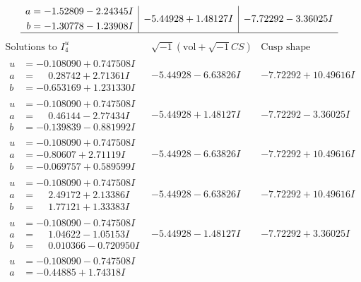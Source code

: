 \documentclass[1p]{elsarticle_modified}
\theoremstyle{definition}
\newcommand{\I}{\sqrt{-1}}
\begin{document}
$$\begin{array}{c|c|c}
\begin{aligned}
a &= -1.52809 - 2.24345 I \\
b &= -1.30778 - 1.23908 I\end{aligned}
 & -5.44928 + 1.48127 I & -7.72292 - 3.36025 I\\
 \hline 
 \end{array}$$\newpage$$\begin{array}{c|c|c}  
\text{Solutions to }I^u_{4}& \I (\text{vol} + \sqrt{-1}CS) & \text{Cusp shape}\\
 \hline 
\begin{aligned}
u &= -0.108090 + 0.747508 I \\
a &= \phantom{-}0.28742 + 2.71361 I \\
b &= -0.653169 + 1.231330 I\end{aligned}
 & -5.44928 - 6.63826 I & -7.72292 + 10.49616 I \\ \hline\begin{aligned}
u &= -0.108090 + 0.747508 I \\
a &= \phantom{-}0.46144 - 2.77434 I \\
b &= -0.139839 - 0.881992 I\end{aligned}
 & -5.44928 + 1.48127 I & -7.72292 - 3.36025 I \\ \hline\begin{aligned}
u &= -0.108090 + 0.747508 I \\
a &= -0.80607 + 2.71119 I \\
b &= -0.069757 + 0.589599 I\end{aligned}
 & -5.44928 - 6.63826 I & -7.72292 + 10.49616 I \\ \hline\begin{aligned}
u &= -0.108090 + 0.747508 I \\
a &= \phantom{-}2.49172 + 2.13386 I \\
b &= \phantom{-}1.77121 + 1.33383 I\end{aligned}
 & -5.44928 - 6.63826 I & -7.72292 + 10.49616 I \\ \hline\begin{aligned}
u &= -0.108090 - 0.747508 I \\
a &= \phantom{-}1.04622 - 1.05153 I \\
b &= \phantom{-}0.010366 - 0.720950 I\end{aligned}
 & -5.44928 - 1.48127 I & -7.72292 + 3.36025 I \\ \hline\begin{aligned}
u &= -0.108090 - 0.747508 I \\
a &= -0.44885 + 1.74318 I \\

\end{aligned}
\end{array}$$
\end{document}
